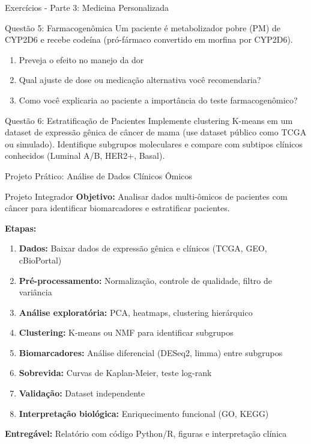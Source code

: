\begin{frame}{Exercícios - Parte 3: Medicina Personalizada}
\begin{block}{Questão 5: Farmacogenômica}
Um paciente é metabolizador pobre (PM) de CYP2D6 e recebe codeína (pró-fármaco convertido em morfina por CYP2D6).

\begin{enumerate}
    \item Preveja o efeito no manejo da dor
    \item Qual ajuste de dose ou medicação alternativa você recomendaria?
    \item Como você explicaria ao paciente a importância do teste farmacogenômico?
\end{enumerate}
\end{block}

\begin{block}{Questão 6: Estratificação de Pacientes}
Implemente clustering K-means em um dataset de expressão gênica de câncer de mama (use dataset público como TCGA ou simulado). Identifique subgrupos moleculares e compare com subtipos clínicos conhecidos (Luminal A/B, HER2+, Basal).
\end{block}
\end{frame}

\begin{frame}{Projeto Prático: Análise de Dados Clínicos Ômicos}
\begin{alertblock}{Projeto Integrador}
\textbf{Objetivo:} Analisar dados multi-ômicos de pacientes com câncer para identificar biomarcadores e estratificar pacientes.

\textbf{Etapas:}
\begin{enumerate}
    \item \textbf{Dados:} Baixar dados de expressão gênica e clínicos (TCGA, GEO, cBioPortal)
    \item \textbf{Pré-processamento:} Normalização, controle de qualidade, filtro de variância
    \item \textbf{Análise exploratória:} PCA, heatmaps, clustering hierárquico
    \item \textbf{Clustering:} K-means ou NMF para identificar subgrupos
    \item \textbf{Biomarcadores:} Análise diferencial (DESeq2, limma) entre subgrupos
    \item \textbf{Sobrevida:} Curvas de Kaplan-Meier, teste log-rank
    \item \textbf{Validação:} Dataset independente
    \item \textbf{Interpretação biológica:} Enriquecimento funcional (GO, KEGG)
\end{enumerate}

\textbf{Entregável:} Relatório com código Python/R, figuras e interpretação clínica
\end{alertblock}
\end{frame}

